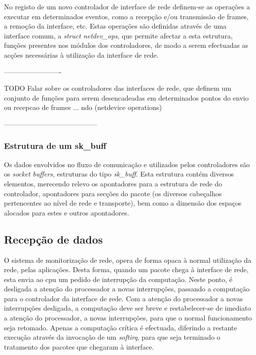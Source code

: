 No registo de um novo controlador de interface de rede definem-se as operações a executar em determinados eventos, como a recepção e/ou transmissão de frames, a remoção da interface, etc.
Estas operações são definidas através de uma interface comum, a \textit{struct netdev\_ops}, que permite afectar a esta estrutura, funções presentes nos módulos dos controladores, de modo a serem efectuadas as acções necessárias à utilização da interface de rede.

-------------------------

TODO
Falar sobre os controladores das interfaces de rede, que definem um conjunto de funções para serem desencadeadas em determinados pontos do envio ou recepcao de frames ... ndo (netdevice operations) 
 
-----------------------------------------

\subsubsection{Estrutura de um sk\_buff}
\label{subsub:sk_buff}

Os dados envolvidos no fluxo de comunicação e utilizados pelos controladores são os \textit{socket buffers}, estruturas do tipo \textit{sk\_buff}.
Esta estrutura contém diversos elementos, merecendo relevo os apontadores para a estrutura de rede do controlador, apontadores para secções do pacote (os diversos cabeçalhos pertencentes ao nível de rede e transporte), bem como a dimensão dos espaços alocados para estes e outros apontadores.

\subsection{Recepção de dados}

O sistema de monitorização de rede, opera de forma opaca à normal utilização da rede, pelas aplicações.
Desta forma, quando um pacote chega à interface de rede, esta envia ao cpu um pedido de interrupção da computação.
Neste ponto, é desligada a atenção do processador a novas interrupções, passando a computação para o controlador da interface de rede.
Com a atenção do processador a novas interrupções desligada, a computação deve ser breve e restabelecer-se de imediato a atenção do processador, a novas interrupções, para que o normal funcionamento seja retomado.
Apenas a computação crítica é efectuada, diferindo a restante execução através da invocação de um \textit{softirq}, para que seja terminado o tratamento dos pacotes que chegaram à interface.

